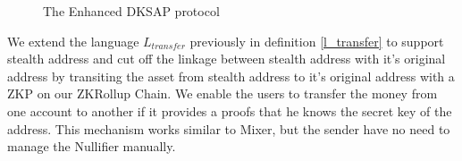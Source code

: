 \begin{figure}[H]
\centering
{}
\caption{The Enhanced DKSAP protocol}
\label{fig:edksap}
\end{figure}

We extend the language $L_{transfer}$ previously in definition \ref{l_transfer} to support stealth address and cut off the linkage between stealth address with it's original address by transiting the asset from stealth address to it's original address with a ZKP on our ZKRollup Chain. We enable the users to transfer the money from one account to another if it provides a proofs that he knows the secret key of the address. This mechanism works similar to Mixer, but the sender have no need to manage the Nullifier manually. 



